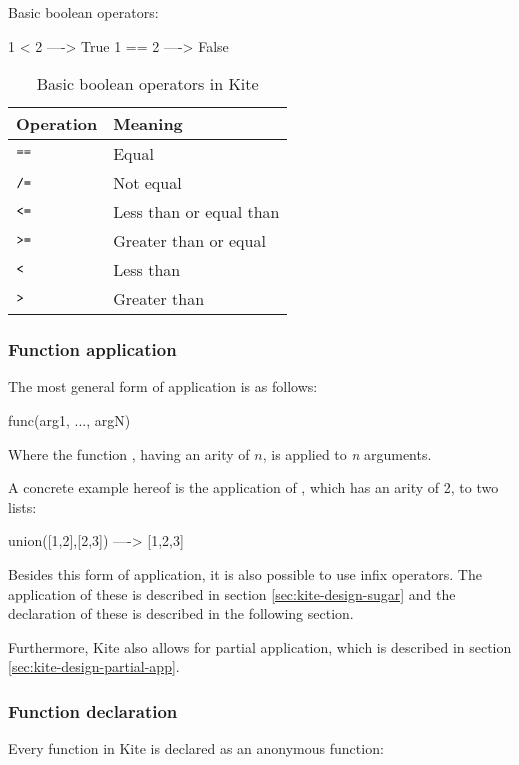 Basic boolean operators:
\begin{kite}
1 < 2  ----> True
1 == 2 ----> False
\end{kite}

\begin{table}[H]
  \centering
  \begin{tabular}{ll}
    \textbf{Operation} & \textbf{Meaning} \\ \hline
    $\texttt{==}$ & Equal                   \\ \hline
    $\texttt{/=}$ & Not equal               \\ \hline
    $\texttt{<=}$ & Less than or equal than \\ \hline
    $\texttt{>=}$ & Greater than or equal   \\ \hline
    $\texttt{<}$  & Less than               \\ \hline
    $\texttt{>}$  & Greater than            \\ \hline
  \end{tabular}
  \caption{Basic boolean operators in Kite}
\label{tbl:kite-disign-bool-op}
\end{table}

\subsubsection{Function application}
\label{sec:kite-design-func-app}
The most general form of application is as follows:
\begin{kite}
func(arg1, ..., argN)
\end{kite}

Where the function , having an arity of $n$, is applied to \emph{n} arguments.

A concrete example hereof is the application of , which has an arity of 2, to two lists:
\begin{kite}
union([1,2],[2,3]) ----> [1,2,3]
\end{kite}

Besides this form of application, it is also possible to use infix operators. The application of these is described in section \ref{sec:kite-design-sugar} and the declaration of these is described in the following section.

Furthermore, Kite also allows for partial application, which is described in section \ref{sec:kite-design-partial-app}.




\subsubsection{Function declaration}
\label{sec:func-decl}
Every function in Kite is declared as an anonymous function:

